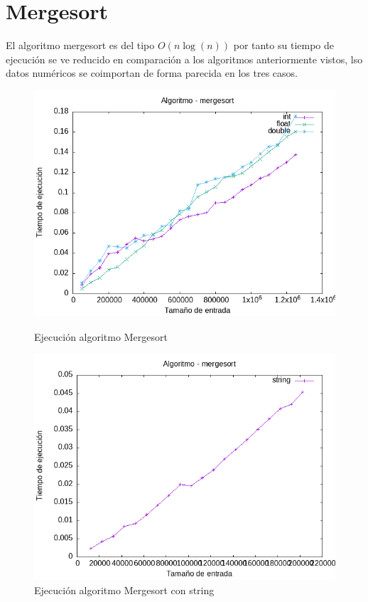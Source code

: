 \documentclass[11pt,openany]{book}
\begin{document}
\section*{Mergesort}
El algoritmo mergesort es del tipo $O(n\log(n))$ por tanto su tiempo de ejecución se ve reducido en comparación a los algoritmos
anteriormente vistos, lso datos numéricos se coimportan de forma parecida en los tres casos.
\begin{figure}[H]
    \begin{minipage}{0.5\textwidth}
        \centering
        \includegraphics[width=\linewidth]{assets/Img/mergesort.png}
        \caption{Ejecución algoritmo Mergesort}
        \label{fig:mergesort}
    \end{minipage}%
    \begin{minipage}{0.5\textwidth}
        \centering
        \includegraphics[width=\linewidth]{assets/Img/mergesortstring.png}
        \caption{Ejecución algoritmo Mergesort con string}
        \label{fig:mergesortstring}
    \end{minipage}
\end{figure}
\end{document}
